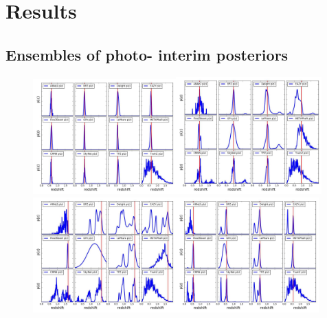 \section{Results}
\label{sec:results}

\subsection{Ensembles of photo- interim posteriors}

\begin{figure}
\includegraphics[width=0.49\textwidth]{fig/pz_12codes_261931_noseaborn_crop.jpg}\includegraphics[width=0.5\textwidth]{fig/pz_12codes_471167_noseaborn_crop.jpg}\\
\includegraphics[width=0.49\textwidth]{fig/pz_12codes_713178_noseaborn_crop.jpg}\includegraphics[width=0.49\textwidth]{fig/pz_12codes_982747_noseaborn_crop.jpg}

\end{figure}
